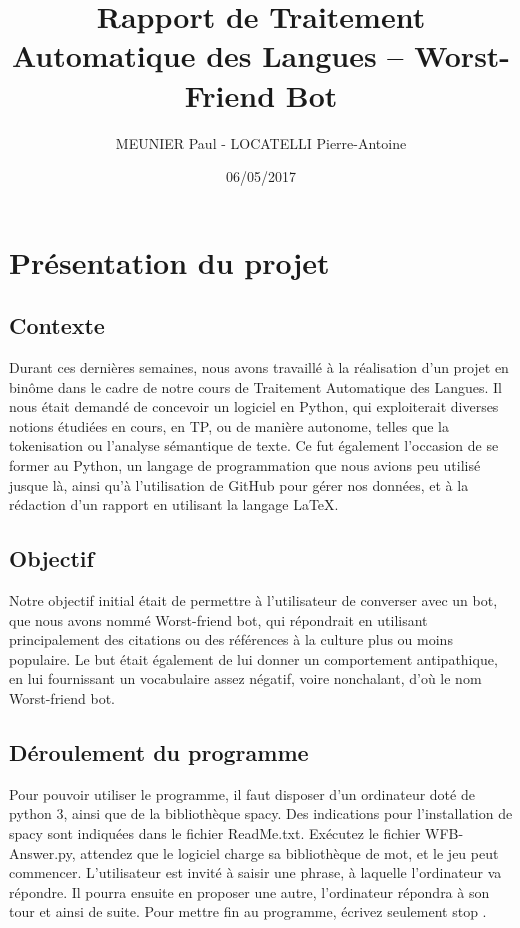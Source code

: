\documentclass[paper=a4, fontsize=11pt]{article}
\begin{document}
\title{Rapport de Traitement Automatique des Langues -- Worst-Friend Bot}
\author{MEUNIER Paul - LOCATELLI Pierre-Antoine}
\date{06/05/2017}
\maketitle

\section{Présentation du projet}

\subsection{Contexte}
Durant ces dernières semaines, nous avons travaillé à la réalisation d'un projet en binôme dans le cadre de notre cours de Traitement Automatique des Langues. Il nous était demandé de concevoir un logiciel en Python, qui exploiterait diverses notions étudiées en cours, en TP, ou de manière autonome, telles que la tokenisation ou l'analyse sémantique de texte. Ce fut également l'occasion de se former au Python, un langage de programmation que nous avions peu utilisé jusque là, ainsi qu'à l'utilisation de GitHub pour gérer nos données, et à la rédaction d'un rapport en utilisant la langage LaTeX.


\subsection{Objectif}
Notre objectif initial était de permettre à l'utilisateur de converser avec un bot, que nous avons nommé Worst-friend bot, qui répondrait en utilisant principalement des citations ou des références à la culture plus ou moins populaire. Le but était également de lui donner un comportement antipathique, en lui fournissant un vocabulaire assez négatif, voire nonchalant, d'où le nom Worst-friend bot.

\subsection{Déroulement du programme}
Pour pouvoir utiliser le programme, il faut disposer d'un ordinateur doté de python 3, ainsi que de la bibliothèque spacy. Des indications pour l'installation de spacy sont indiquées dans le fichier ReadMe.txt. Exécutez le fichier WFB-Answer.py, attendez que le logiciel charge sa bibliothèque de mot, et le jeu peut commencer. L'utilisateur est invité à saisir une phrase, à laquelle l'ordinateur va répondre. Il pourra ensuite en proposer une autre, l'ordinateur répondra à son tour et ainsi de suite. Pour mettre fin au programme, écrivez seulement \og stop \fg{}.
\end{document}
